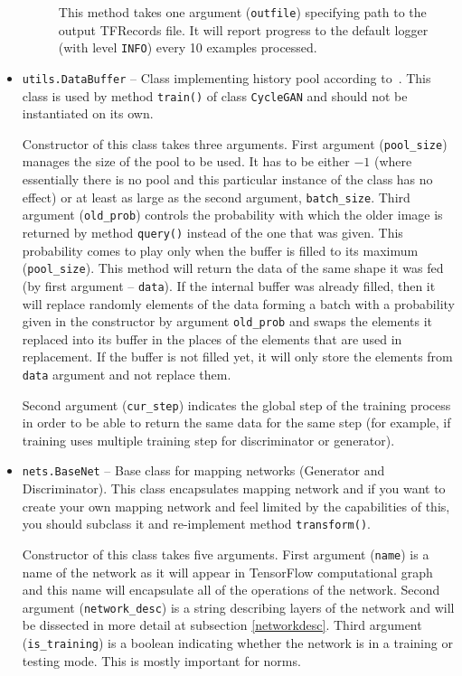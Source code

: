 \begin{itemize}
\begin{description}
 This method takes one argument (\texttt{outfile}) specifying path to the output TFRecords file. It will report progress to the default logger (with level \texttt{INFO}) every 10 examples processed.
\end{description}
\item \texttt{utils.DataBuffer} -- Class implementing history pool according to~\cite{historypool}. This class is used by method \texttt{train()} of class \texttt{CycleGAN} and should not be instantiated on its own.
\begin{description}
 Constructor of this class takes three arguments. First argument (\texttt{pool\_size}) manages the size of the pool to be used. It has to be either $-1$ (where essentially there is no pool and this particular instance of the class has no effect) or at least as large as the second argument, \texttt{batch\_size}. Third argument (\texttt{old\_prob}) controls the probability with which the older image is returned by method \texttt{query()} instead of the one that was given. This probability comes to play only when the buffer is filled to its maximum (\texttt{pool\_size}).
 This method will return the data of the same shape it was fed (by first argument -- \texttt{data}). If the internal buffer was already filled, then it will replace randomly elements of the data forming a batch with a probability given in the constructor by argument \texttt{old\_prob} and swaps the elements it replaced into its buffer in the places of the elements that are used in replacement. If the buffer is not filled yet, it will only store the elements from \texttt{data} argument and not replace them.

Second argument (\texttt{cur\_step}) indicates the global step of the training process in order to be able to return the same data for the same step (for example, if training uses multiple training step for discriminator or generator).
\end{description}
\item \texttt{nets.BaseNet} -- Base class for mapping networks (Generator and Discriminator). This class encapsulates mapping network and if you want to create your own mapping network and feel limited by the capabilities of this, you should subclass it and re-implement method \texttt{transform()}.
\begin{description}
 Constructor of this class takes five arguments. First argument (\texttt{name}) is a name of the network as it will appear in TensorFlow computational graph and this name will encapsulate all of the operations of the network. Second argument (\texttt{network\_desc}) is a string describing layers of the network and will be dissected in more detail at subsection \ref{networkdesc}. Third argument (\texttt{is\_training}) is a boolean indicating whether the network is in a training or testing mode. This is mostly important for norms.


\end{description}
\end{itemize}
